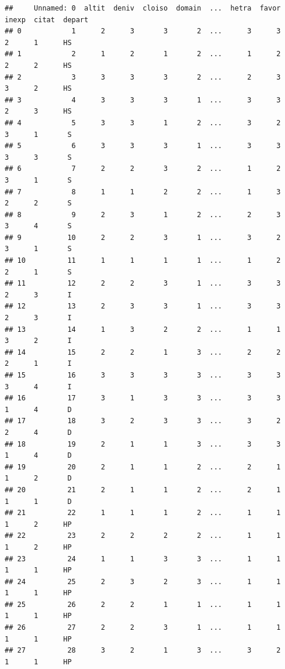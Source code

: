\documentclass[
  10pt,
]{article}
\begin{document}
\begin{verbatim}
##     Unnamed: 0  altit  deniv  cloiso  domain  ...  hetra  favor  inexp  citat  depart
## 0            1      2      3       3       2  ...      3      3      2      1      HS
## 1            2      1      2       1       2  ...      1      2      2      2      HS
## 2            3      3      3       3       2  ...      2      3      3      2      HS
## 3            4      3      3       3       1  ...      3      3      2      3      HS
## 4            5      3      3       1       2  ...      3      2      3      1       S
## 5            6      3      3       3       1  ...      3      3      3      3       S
## 6            7      2      2       3       2  ...      1      2      3      1       S
## 7            8      1      1       2       2  ...      1      3      2      2       S
## 8            9      2      3       1       2  ...      2      3      3      4       S
## 9           10      2      2       3       1  ...      3      2      3      1       S
## 10          11      1      1       1       1  ...      1      2      2      1       S
## 11          12      2      2       3       1  ...      3      3      2      3       I
## 12          13      2      3       3       1  ...      3      3      2      3       I
## 13          14      1      3       2       2  ...      1      1      3      2       I
## 14          15      2      2       1       3  ...      2      2      2      1       I
## 15          16      3      3       3       3  ...      3      3      3      4       I
## 16          17      3      1       3       3  ...      3      3      1      4       D
## 17          18      3      2       3       3  ...      3      2      2      4       D
## 18          19      2      1       1       3  ...      3      3      1      4       D
## 19          20      2      1       1       2  ...      2      1      1      2       D
## 20          21      2      1       1       2  ...      2      1      1      1       D
## 21          22      1      1       1       2  ...      1      1      1      2      HP
## 22          23      2      2       2       2  ...      1      1      1      2      HP
## 23          24      1      1       3       3  ...      1      1      1      1      HP
## 24          25      2      3       2       3  ...      1      1      1      1      HP
## 25          26      2      2       1       1  ...      1      1      1      1      HP
## 26          27      2      2       3       1  ...      1      1      1      1      HP
## 27          28      3      2       1       3  ...      3      2      1      1      HP

\end{verbatim}
\end{document}

